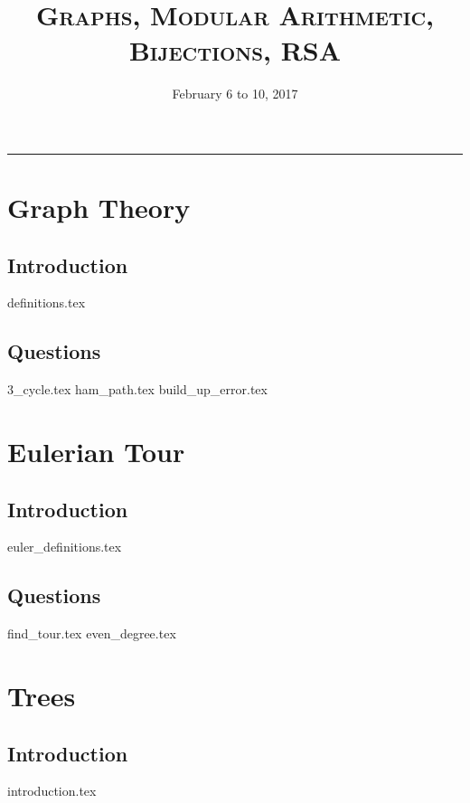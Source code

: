 \documentclass{exam}
\title{\textsc{Graphs, Modular Arithmetic, Bijections, RSA}}
\date{February 6 to 10, 2017}
\begin{document}
\maketitle
\rule{\textwidth}{0.15em}
\fontsize{12}{15}\selectfont
\thispagestyle{empty}

\section{Graph Theory}
\subsection{Introduction}
\begin{questions}
{definitions.tex}
\end{questions}

\subsection{Questions}
\begin{questions}
{3_cycle.tex}
{ham_path.tex}
{build_up_error.tex}
\end{questions}

\section{Eulerian Tour}
\subsection{Introduction}
{euler_definitions.tex}
\subsection{Questions}
\begin{questions}
{find_tour.tex}
{even_degree.tex}
\end{questions}

\section{Trees}
\subsection{Introduction}
{introduction.tex}
\end{document}
